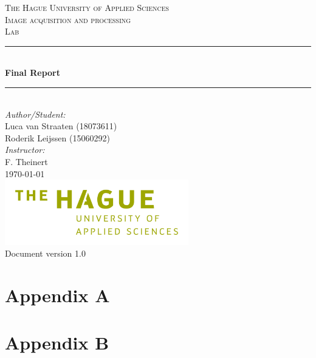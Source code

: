 \documentclass[a4paper]{article}
\begin{document}
\begin{titlepage}

\newcommand{\HRule}{\rule{\linewidth}{0.5mm}} 							%
\center 
 
\textsc{\LARGE The Hague University of Applied Sciences}\\[1cm]

\textsc{\Large Image acquisition and processing}\\[0.2cm]
\textsc{\large Lab}\\[1cm] 										%
\HRule \\[0.8cm]
{ \huge \bfseries Final Report}\\[0.7cm]								%
\HRule \\[2cm]
\large
\emph{Author/Student:}\\
Luca van Straaten (18073611)\\													%
Roderik Leijssen (15060292)\\[1.5cm]
\emph{Instructor:}\\
F.  Theinert\\[1.5cm]										
{\large \today}\\[5cm]
\includegraphics[width=0.6\textwidth]{images/hhs.png}\\[1cm] 	%
\vfill
Document version 1.0
\end{titlepage}


\newpage
  \tableofcontents
\newpage
{}


\graphicspath{ {./images/} }
\renewcommand{\thesubsection}{\thesection.\alph{subsection}}







%



\newpage



\newpage
\appendix
\section{Appendix A}
\label{sec:appendix_A}



\section{Appendix B}
\label{sec:appendix_B}


\end{document}
